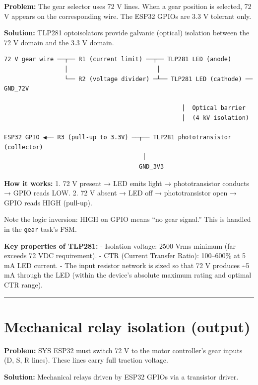 \documentclass[12pt,a4paper,oneside]{report}
\begin{document}
\textbf{Problem:} The gear selector uses 72 V lines. When a gear position is
selected, 72 V appears on the corresponding wire. The ESP32 GPIOs are 3.3 V
tolerant only.

\textbf{Solution:} TLP281 optoisolators provide galvanic (optical) isolation
between the 72 V domain and the 3.3 V domain.

\begin{verbatim}
72 V gear wire ──┬── R1 (current limit) ──┬── TLP281 LED (anode)
                 │                         │
                 └── R2 (voltage divider) ─┴── TLP281 LED (cathode) ── GND_72V

                                                  │  Optical barrier
                                                  │  (4 kV isolation)

ESP32 GPIO ◀── R3 (pull-up to 3.3V) ──┬── TLP281 phototransistor (collector)
                                       │
                                      GND_3V3
\end{verbatim}

\textbf{How it works:} 1. 72 V present → LED emits light → phototransistor
conducts → GPIO reads LOW. 2. 72 V absent → LED off → phototransistor open →
GPIO reads HIGH (pull-up).

Note the logic inversion: HIGH on GPIO means ``no gear signal.'' This is handled
in the \texttt{gear} task's FSM.

\textbf{Key properties of TLP281:} - Isolation voltage: 2500 Vrms minimum (far
exceeds 72 VDC requirement). - CTR (Current Transfer Ratio): 100--600\% at 5 mA
LED current. - The input resistor network is sized so that 72 V produces
\textasciitilde5 mA through the LED (within the device's absolute maximum rating
and optimal CTR range).

\begin{center}\rule{0.5\linewidth}{0.5pt}\end{center}

\section{Mechanical relay isolation
(output)}\label{mechanical-relay-isolation-output}

\textbf{Problem:} SYS ESP32 must switch 72 V to the motor controller's gear
inputs (D, S, R lines). These lines carry full traction voltage.

\textbf{Solution:} Mechanical relays driven by ESP32 GPIOs via a transistor
driver.
\end{document}
